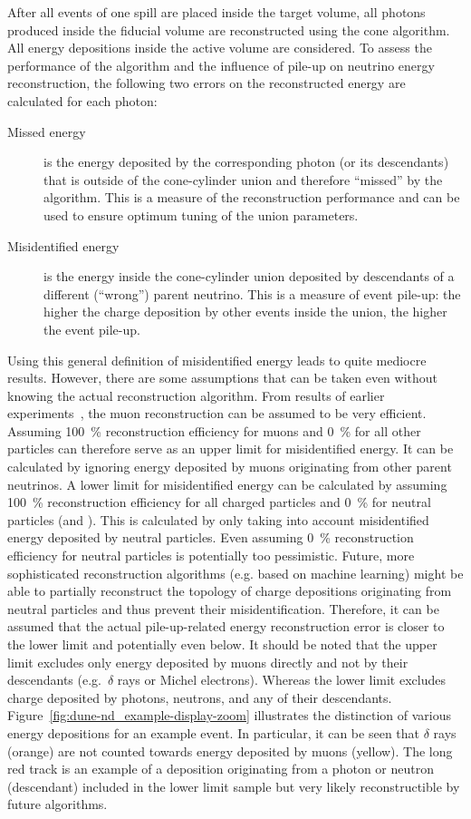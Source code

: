 After all events of one spill are placed inside the target volume, all \Pgpz photons produced inside the fiducial volume are reconstructed using the cone algorithm.
All energy depositions inside the active volume are considered.
To assess the performance of the algorithm and the influence of pile-up on neutrino energy reconstruction, the following two errors on the reconstructed energy are calculated for each \Pgpz photon:
\begin{description}
	\item[Missed energy] is the energy deposited by the corresponding \Pgpz photon (or its descendants) that is outside of the cone-cylinder union and therefore ``missed'' by the algorithm.
		This is a measure of the reconstruction performance and can be used to ensure optimum tuning of the union parameters.
	\item[Misidentified energy] is the energy inside the cone-cylinder union deposited by descendants of a different (``wrong'') parent neutrino.
		This is a measure of event pile-up: the higher the charge deposition by other events inside the union, the higher the event pile-up.
\end{description}
Using this general definition of misidentified energy leads to quite mediocre results.
However, there are some assumptions that can be taken even without knowing the actual reconstruction algorithm.
From results of earlier experiments~\cite{pandora}, the muon reconstruction can be assumed to be very efficient.
Assuming \SI{100}{\percent} reconstruction efficiency for muons and \SI{0}{\percent} for all other particles can therefore serve as an upper limit for misidentified energy.
It can be calculated by ignoring energy deposited by muons originating from other parent neutrinos.
A lower limit for misidentified energy can be calculated by assuming \SI{100}{\percent} reconstruction efficiency for all charged particles and \SI{0}{\percent} for neutral particles (\Pgg and \Pn).
This is calculated by only taking into account misidentified energy deposited by neutral particles.
Even assuming \SI{0}{\percent} reconstruction efficiency for neutral particles is potentially too pessimistic.
Future, more sophisticated reconstruction algorithms (e.g. based on machine learning) might be able to partially reconstruct the topology of charge depositions originating from neutral particles and thus prevent their misidentification.
Therefore, it can be assumed that the actual pile-up-related energy reconstruction error is closer to the lower limit and potentially even below.
It should be noted that the upper limit excludes only energy deposited by muons directly and not by their descendants (e.g.\ $\delta$ rays or Michel electrons).
Whereas the lower limit excludes charge deposited by photons, neutrons, and any of their descendants.
Figure~\ref{fig:dune-nd_example-display-zoom} illustrates the distinction of various energy depositions for an example event.
In particular, it can be seen that $\delta$ rays (orange) are not counted towards energy deposited by muons (yellow).
The long red track is an example of a deposition originating from a photon or neutron (descendant) included in the lower limit sample but very likely reconstructible by future algorithms.


